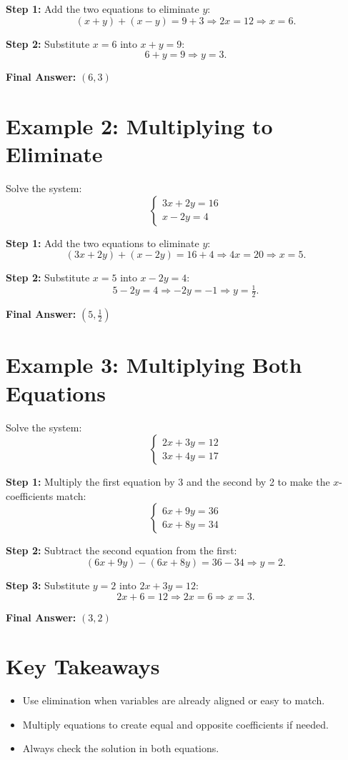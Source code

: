\documentclass[12pt]{article}
\begin{document}
\textbf{Step 1:} Add the two equations to eliminate \(y\):
\[
(x + y) + (x - y) = 9 + 3 \Rightarrow 2x = 12 \Rightarrow x = 6.
\]

\textbf{Step 2:} Substitute \(x = 6\) into \(x + y = 9\):
\[
6 + y = 9 \Rightarrow y = 3.
\]

\textbf{Final Answer:} \(\boxed{(6, 3)}\)

\section*{Example 2: Multiplying to Eliminate}

Solve the system:
\[
\begin{cases}
3x + 2y = 16 \\
x - 2y = 4
\end{cases}
\]

\textbf{Step 1:} Add the two equations to eliminate \(y\):
\[
(3x + 2y) + (x - 2y) = 16 + 4 \Rightarrow 4x = 20 \Rightarrow x = 5.
\]

\textbf{Step 2:} Substitute \(x = 5\) into \(x - 2y = 4\):
\[
5 - 2y = 4 \Rightarrow -2y = -1 \Rightarrow y = \tfrac{1}{2}.
\]

\textbf{Final Answer:} \(\boxed{(5, \tfrac{1}{2})}\)

\section*{Example 3: Multiplying Both Equations}

Solve the system:
\[
\begin{cases}
2x + 3y = 12 \\
3x + 4y = 17
\end{cases}
\]

\textbf{Step 1:} Multiply the first equation by 3 and the second by 2 to make the \(x\)-coefficients match:
\[
\begin{cases}
6x + 9y = 36 \\
6x + 8y = 34
\end{cases}
\]

\textbf{Step 2:} Subtract the second equation from the first:
\[
(6x + 9y) - (6x + 8y) = 36 - 34 \Rightarrow y = 2.
\]

\textbf{Step 3:} Substitute \(y = 2\) into \(2x + 3y = 12\):
\[
2x + 6 = 12 \Rightarrow 2x = 6 \Rightarrow x = 3.
\]

\textbf{Final Answer:} \(\boxed{(3, 2)}\)

\section*{Key Takeaways}
\begin{itemize}
    \item Use elimination when variables are already aligned or easy to match.
    \item Multiply equations to create equal and opposite coefficients if needed.
    \item Always check the solution in both equations.
\end{itemize}
\end{document}
